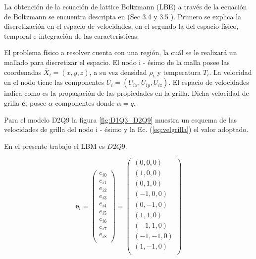 La obtención de la ecuación de lattice Boltzmann (LBE) a través de la ecuación de Boltzmann se encuentra descripta en \cite{kruger2017lattice} (Sec 3.4 y 3.5 ). Primero se explica la discretización en el espacio de velocidades, en el segundo la del espacio físico, temporal e integración de las características.

El problema físico a resolver cuenta con una región, la cuál se le realizará un mallado para discretizar el espacio. El nodo i - ésimo de la malla posee las coordenadas ${\bar{X}}_{i} = (x,y,z)$, a su vez densidad $\rho_{i}$ y temperatura $T_{i}$. La velocidad en el nodo tiene las componentes ${\bar{U}}_{i} = ({U}_{ix},{U}_{iy},{U}_{iz})$. El espacio de velocidades indica como es la propagación de las propiedades en la grilla. Dicha velocidad de grilla $\mathbf{e}_{i}$ posee $\alpha$ componentes donde $\alpha = q $. 

Para el modelo D2Q9 la figura \ref{fig:D1Q3_D2Q9} muestra un esquema de las velocidades de grilla del nodo i - ésimo y la Ec. (\ref{eq:velgrilla}) el valor adoptado.

En el presente trabajo el LBM es $D2Q9$. 


\begin{equation}
    {\mathbf{e}}_{i} =  
    \left( \begin{array}{c} 
                e_{i0} \\ e_{i1}\\ e_{i2}\\ e_{i3}\\ e_{i4}\\ e_{i5}\\
                e_{i6}\\ e_{i7}\\ e_{i8}\\
            \end{array}
    \right) =
    \left( \begin{array}{c} 
        (0,0,0) \\ (1,0,0) \\ (0,1,0) \\(-1,0,0) \\ (0,-1,0) \\ (1,1,0) \\
        (-1,1,0) \\ (-1,-1,0) \\ (1,-1,0)\\ 
    \end{array}
    \right) 
    \label{eq:velgrilla}
\end{equation}

